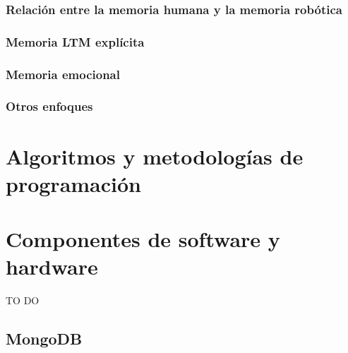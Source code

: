 \subsubsection{Relación entre la memoria humana y la memoria robótica}

\subsubsection{Memoria LTM explícita}

\subsubsection{Memoria emocional}

\subsubsection{Otros enfoques}



\section{Algoritmos y metodologías de programación}


\section{Componentes de software y hardware}
TO DO

\subsection{MongoDB}

